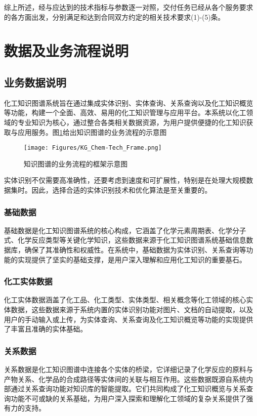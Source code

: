 综上所述，经与应达到的技术指标与参数逐一对照，交付任务已经从各个服务要求的各方面出发，分别满足和达到合同双方约定的相关技术要求\textrm{(1)-(5)}条。

\section{数据及业务流程说明}
\subsection{业务数据说明} 
化工知识图谱系统旨在通过集成实体识别、实体查询、关系查询以及化工知识概览等功能，构建一个全面、高效、易用的化工知识管理与应用平台。本系统以化工领域的专业知识为核心，通过整合各类相关数据资源，为用户提供便捷的化工知识获取与应用服务。图\ref{Fig:KG_Chem-Tech_Frame}给出知识图谱的业务流程的示意图%
\begin{figure}[h!]
\centering
\texttt{[image: Figures/KG\_Chem-Tech\_Frame.png]}
\caption{\small\textrm{知识图谱的业务流程的框架示意图}}%
\label{Fig:KG_Chem-Tech_Frame}
\end{figure}
实体识别不仅需要高准确性，还要考虑到速度和可扩展性，特别是在处理大规模数据集时。因此，选择合适的实体识别技术和优化算法是至关重要的。

\subsubsection{基础数据} 
基础数据是化工知识图谱系统的核心构成，它涵盖了化学元素周期表、化学分子式、化学反应类型等关键化学知识，这些数据来源于化工知识图谱系统基础信息数据库，确保了其准确性和权威性。在系统中，基础数据为实体识别、关系查询等功能的实现提供了坚实的基础支撑，是用户深入理解和应用化工知识的重要基石。

\subsubsection{化工实体数据} 
化工实体数据涵盖了化工品、化工类型、实体类型、相关概念等化工领域的核心实体数据，这些数据来源于系统内置的实体识别功能对图片、文档的自动提取，以及用户的手动输入或上传，为实体查询、关系查询及化工知识概览等功能的实现提供了丰富且准确的实体基础。

\subsubsection{关系数据} 
关系数据是化工知识图谱中连接各个实体的桥梁，它详细记录了化学反应的原料与产物关系、化学品的合成路径等实体间的关联与相互作用。这些数据既源自系统内部通过关系查询功能对知识库的智能提取。它们共同构成了化工知识概览与关系查询功能不可或缺的关系基础，为用户深入探索和理解化工领域的复杂关系提供了强有力的支持。

